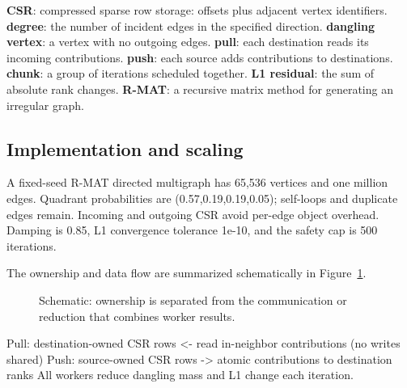 \documentclass[11pt,a4paper]{article}
\newcommand{\term}[2]{\textbf{#1}: #2.}
\begin{document}
\begin{tcolorbox}[title=Terms used in this section]\small \term{CSR}{compressed sparse row storage: offsets plus adjacent vertex identifiers} \term{degree}{the number of incident edges in the specified direction} \term{dangling vertex}{a vertex with no outgoing edges} \term{pull}{each destination reads its incoming contributions} \term{push}{each source adds contributions to destinations} \term{chunk}{a group of iterations scheduled together} \term{L1 residual}{the sum of absolute rank changes} \term{R-MAT}{a recursive matrix method for generating an irregular graph}\end{tcolorbox}

\subsection{Implementation and scaling}

A fixed-seed R-MAT directed multigraph has 65,536 vertices and one million edges. Quadrant probabilities are (0.57,0.19,0.19,0.05); self-loops and duplicate edges remain. Incoming and outgoing CSR avoid per-edge object overhead. Damping is 0.85, L1 convergence tolerance 1e-10, and the safety cap is 500 iterations.


The ownership and data flow are summarized schematically in Figure~\ref{fig:flow4}.

\begin{figure}[htbp]\centering{}

\caption{Schematic: ownership is separated from the communication or reduction that combines worker results.}\label{fig:flow4}\end{figure}

Pull: destination-owned CSR rows <- read in-neighbor contributions (no writes shared)\newline{} Push: source-owned CSR rows -> atomic contributions to destination ranks\newline{} All workers reduce dangling mass and L1 change each iteration.
\end{document}
